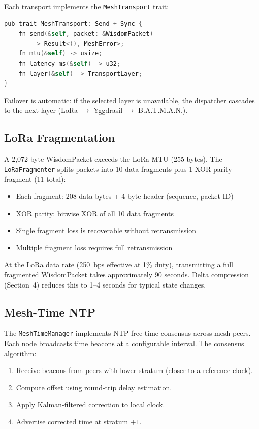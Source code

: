 \documentclass[11pt,twocolumn]{article}
\begin{document}
Each transport implements the \texttt{MeshTransport} trait:

\begin{lstlisting}[language=C,caption={Transport trait}]
pub trait MeshTransport: Send + Sync {
    fn send(&self, packet: &WisdomPacket)
        -> Result<(), MeshError>;
    fn mtu(&self) -> usize;
    fn latency_ms(&self) -> u32;
    fn layer(&self) -> TransportLayer;
}
\end{lstlisting}

Failover is automatic: if the selected layer is unavailable, the
dispatcher cascades to the next layer (LoRa $\rightarrow$ Yggdrasil
$\rightarrow$ B.A.T.M.A.N.).

\subsection{LoRa Fragmentation}

A 2,072-byte WisdomPacket exceeds the LoRa MTU (255 bytes). The
\texttt{LoRaFragmenter} splits packets into 10 data fragments plus
1 XOR parity fragment (11 total):

\begin{itemize}[nosep]
  \item Each fragment: 208 data bytes + 4-byte header (sequence, packet ID)
  \item XOR parity: bitwise XOR of all 10 data fragments
  \item Single fragment loss is recoverable without retransmission
  \item Multiple fragment loss requires full retransmission
\end{itemize}

At the LoRa data rate (250~bps effective at 1\% duty), transmitting
a full fragmented WisdomPacket takes approximately 90 seconds. Delta
compression (Section~4) reduces this to 1--4 seconds for typical
state changes.

\subsection{Mesh-Time NTP}

The \texttt{MeshTimeManager} implements NTP-free time consensus
across mesh peers. Each node broadcasts time beacons at a configurable
interval. The consensus algorithm:

\begin{enumerate}[nosep]
  \item Receive beacons from peers with lower stratum (closer to a
    reference clock).
  \item Compute offset using round-trip delay estimation.
  \item Apply Kalman-filtered correction to local clock.
  \item Advertise corrected time at stratum $+1$.
\end{enumerate}
\end{document}
